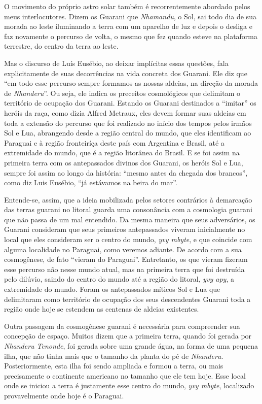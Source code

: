 O movimento do próprio astro solar também é recorrentemente abordado
pelos meus interlocutores. Dizem os Guarani que \emph{Nhamandu}, o Sol, sai
todo dia de sua morada ao leste iluminando a terra com um aparelho de
luz e depois o desliga e faz novamente o percurso de volta, o mesmo que
fez quando esteve na plataforma terrestre, do centro da terra ao leste.

Mas o discurso de Luís Eusébio, ao deixar implícitas essas questões,
fala explicitamente de suas decorrências na vida concreta dos Guarani.
Ele diz que ``em todo esse percurso sempre formamos as nossas aldeias,
na direção da morada de \emph{Nhanderu}''. Ou seja, ele indica os preceitos
cosmológicos que delimitam o território de ocupação dos Guarani.
Estando os Guarani destinados a ``imitar'' os heróis da raça, como dizia
Alfred Metraux, eles devem formar suas aldeias em toda a extensão do
percurso que foi realizado no início dos tempos pelos irmãos Sol e Lua,
abrangendo desde a região central do mundo, que eles identificam ao
Paraguai e à região fronteiríça deste país com Argentina e Brasil, até
a extremidade do mundo, que é a região litorânea do Brasil. E se foi
assim na primeira terra com os antepassados divinos dos Guarani, os
heróis Sol e Lua, sempre foi assim ao longo da história: ``mesmo antes
da chegada dos brancos'', como diz Luis Eusébio, ``já estávamos na beira
do mar''.

Entende-se, assim, que a ideia mobilizada pelos setores contrários à
demarcação das terras guarani no litoral guarda uma consonância com a
cosmologia guarani que não passa de um mal entendido. Da mesma maneira
que seus adversários, os Guarani consideram que seus primeiros
antepassados viveram inicialmente no local que eles consideram ser o
centro do mundo, \emph{yvy mbyte}, e que coincide com alguma localidade no
Paraguai, como veremos adiante. De acordo com a sua cosmogênese, de
fato ``vieram do Paraguai''. Entretanto, os que vieram fizeram esse
percurso não nesse mundo atual, mas na primeira terra que foi destruída
pelo dilúvio, saindo do centro do mundo até a região do litoral, \emph{yvy
apy}, a extremidade do mundo. Foram os antepassados míticos Sol e Lua
que delimitaram como território de ocupação dos seus descendentes
Guarani toda a região onde hoje se estendem as centenas de aldeias
existentes.

Outra passagem da cosmogênese guarani é necessária para compreender sua
concepção de espaço. Muitos dizem que a primeira terra, quando foi
gerada por \emph{Nhanderu Tenonde}, foi gerada sobre uma grande água, na forma
de uma pequena ilha, que não tinha mais que o tamanho da planta do pé
de \emph{Nhanderu}. Posteriormente, esta ilha foi sendo ampliada e formou a
terra, ou mais precisamente o continente americano no tamanho que ele
tem hoje. Esse local onde se iniciou a terra é justamente esse centro
do mundo, \emph{yvy mbyte}, localizado provavelmente onde hoje é o Paraguai.


